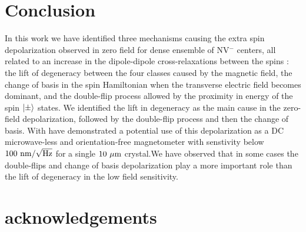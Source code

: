 \documentclass[preprintnumbers,amsmath,amssymb,superscriptaddress,twocolumn,showpacs]{revtex4-2}
\begin{document}
\section*{Conclusion}
In this work we have identified three mechanisms causing the extra spin depolarization observed in zero field for dense ensemble of NV$^-$ centers, all related to an increase in the dipole-dipole cross-relaxations between the spins : the lift of degeneracy between the four classes caused by the magnetic field, the change of basis in the spin Hamiltonian when the transverse electric field becomes dominant, and the double-flip process allowed by the proximity in energy of the spin $\ket{\pm}$ states. We identified the lift in degeneracy as the main cause in the zero-field depolarization, followed by the double-flip process and then the change of basis. With have demonstrated a potential use of this depolarization as a DC microwave-less and orientation-free magnetometer with senstivity below $100\ \rm{nm}/\sqrt{\rm Hz}$ for a single $10\ \mu \rm m$ crystal.We have observed that in some cases the double-flips and change of basis depolarization play a more important role than the lift of degeneracy in the low field sensitivity.
\section*{acknowledgements}


{}
\end{document}
